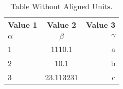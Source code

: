 \documentclass{article}
\begin{document}
	\begin{table}[h!]
		\begin{center}
			\caption{Table Without Aligned Units.}
			\label{tab:table1}
			\begin{tabular}{l|c|r}
				\textbf{Value 1} & \textbf{Value 2} &
				\textbf{Value 3}\\
				$\alpha$ &$\beta$ & $\gamma$ \\
				\hline
                1 & 1110.1 & a\\
                2 & 10.1 & b\\
                3 & 23.113231 &c\\			
			\end{tabular}
		\end{center}
	\end{table}
	
\end{document}
